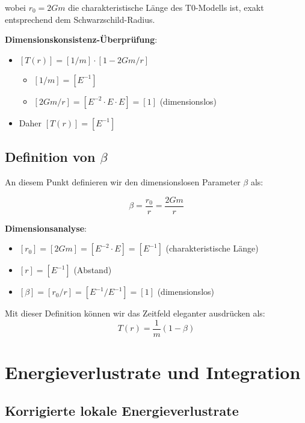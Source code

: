 \documentclass[12pt,a4paper]{article}
\begin{document}
	wobei $r_0 = 2Gm$ die charakteristische Länge des T0-Modells ist, exakt entsprechend dem Schwarzschild-Radius.
	
	\textbf{Dimensionskonsistenz-Überprüfung}:
	\begin{itemize}
		\item $[T(r)] = [1/m] \cdot [1 - 2Gm/r]$
		\begin{itemize}
			\item $[1/m] = [E^{-1}]$
			\item $[2Gm/r] = [E^{-2} \cdot E \cdot E] = [1]$ (dimensionslos)
		\end{itemize}
		\item Daher $[T(r)] = [E^{-1}]$ \checkmark
	\end{itemize}
	
	\subsection{Definition von $\beta$}
	
	An diesem Punkt definieren wir den dimensionslosen Parameter $\beta$ als:
	
	\begin{equation}
		\label{eq:beta_definition}
		\beta = \frac{r_0}{r} = \frac{2Gm}{r}
	\end{equation}
	
	\textbf{Dimensionsanalyse}:
	\begin{itemize}
		\item $[r_0] = [2Gm] = [E^{-2} \cdot E] = [E^{-1}]$ (charakteristische Länge)
		\item $[r] = [E^{-1}]$ (Abstand)
		\item $[\beta] = [r_0/r] = [E^{-1}/E^{-1}] = [1]$ (dimensionslos) \checkmark
	\end{itemize}
	
	Mit dieser Definition können wir das Zeitfeld eleganter ausdrücken als:
	\begin{equation}
		\label{eq:time_field_with_beta}
		T(r) = \frac{1}{m}(1 - \beta)
	\end{equation}
	
	\section{Energieverlustrate und Integration}
	\label{sec:loss_rate}
	
	\subsection{Korrigierte lokale Energieverlustrate}
	\label{subsec:local_rate}
	
\end{document}
